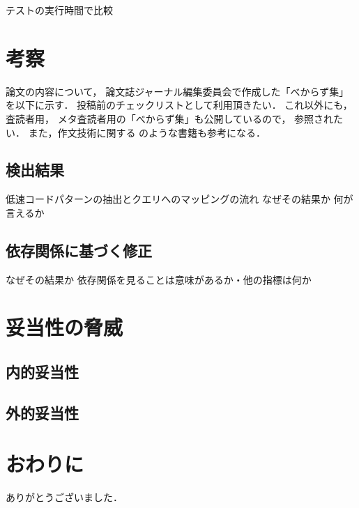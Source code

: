 \documentclass[submit,techrep,noauthor]{ipsj}
\begin{document}
テストの実行時間で比較


\section{考察}
\label{sec5:format}

論文の内容について，
論文誌ジャーナル編集委員会で作成した「べからず集」を以下に示す．
投稿前のチェックリストとして利用頂きたい．
これ以外にも，査読者用，
メタ査読者用の「べからず集」\cite{webpage2}も公開しているので，
参照されたい．
また，作文技術に関する \cite{book1, book2, book3, book4}のような書籍も参考になる．



\subsection{検出結果}

低速コードパターンの抽出とクエリへのマッピングの流れ
なぜその結果か
何が言えるか

\subsection{依存関係に基づく修正}

なぜその結果か
依存関係を見ることは意味があるか・他の指標は何か

\section{妥当性の脅威}
\label{sec6:format}

\subsection{内的妥当性}


\subsection{外的妥当性}


\section{おわりに}
\label{sec7:format}


\begin{acknowledgment}
ありがとうございました．
\end{acknowledgment}





\end{document}
